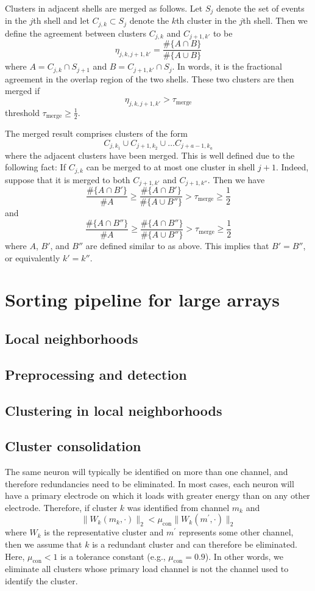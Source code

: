 \documentclass{article}
\begin{document}
Clusters in adjacent shells are merged as follows. Let $S_j$ denote the set of events in the $j$th shell and let $C_{j,k}\subset S_j$ denote the $k$th cluster in the $j$th shell. Then we define the agreement between clusters $C_{j,k}$ and $C_{j+1,k'}$ to be
$$\eta_{j,k,j+1,k'}=\frac{\#\{A\cap B\}}{\#\{A\cup B\}}$$ where
$A=C_{j,k}\cap S_{j+1}$ and $B=C_{j+1,k'}\cap S_j$. In words, it is the fractional agreement in the overlap region of the two shells. These two clusters are then merged if 
$$\eta_{j,k,j+1,k'}>\tau_{\text{merge}}$$  threshold $\tau_{\text{merge}}\geq \frac{1}{2}$.

The merged result comprises clusters of the form
$$C_{j,k_1}\cup C_{j+1,k_2}\cup\dots C_{j+a-1,k_a}$$
where the adjacent clusters have been merged. This is well defined due to the following fact: If $C_{j,k}$ can be merged to at most one cluster in shell $j+1$. Indeed, suppose that it is merged to both $C_{j+1,k'}$ and $C_{j+1,k''}$. Then we have
$$\frac{\#\{A\cap B'\}}{\#A}\geq\frac{\#\{A\cap B'\}}{\#\{A\cup B''\}}>\tau_{\text{merge}}\geq\frac{1}{2}$$
and
$$\frac{\#\{A\cap B''\}}{\#A}\geq\frac{\#\{A\cap B''\}}{\#\{A\cup B''\}}>\tau_{\text{merge}}\geq\frac{1}{2}$$
where $A$, $B'$, and $B''$ are defined similar to as above. This implies that $B'=B''$, or equivalently $k'=k''$.

\section{Sorting pipeline for large arrays}

\subsection{Local neighborhoods}

\subsection{Preprocessing and detection}

\subsection{Clustering in local neighborhoods}

\subsection{Cluster consolidation}

The same neuron will typically be identified on more than one channel, and therefore redundancies need to be eliminated. In most cases, each neuron will have a primary electrode on which it loads with greater energy than on any other electrode. Therefore, if cluster $k$ was identified from channel $m_k$ and 
$$\|W_k(m_k,\cdot)\|_2<\mu_{\text{con}} \|W_k(m^\prime,\cdot)\|_2$$
where $W_k$ is the representative cluster
and $m^\prime$ represents some other channel, then we assume that $k$ is a redundant cluster and can therefore be eliminated. Here, $\mu_{\text{con}}<1$ is a tolerance constant (e.g., $\mu_{\text{con}}=0.9$). In other words, we eliminate all clusters whose primary load channel is not the channel used to identify the cluster.
\end{document}
